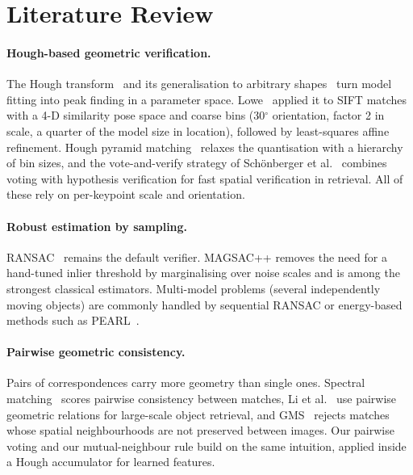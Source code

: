 \documentclass{article}
\begin{document}
\section{Literature Review}

\paragraph{Hough-based geometric verification.}
The Hough transform~\cite{duda1972hough} and its generalisation to arbitrary
shapes~\cite{ballard1981ght} turn model fitting into peak finding in a
parameter space. Lowe~\cite{lowe2004sift} applied it to SIFT matches with a
4-D similarity pose space and coarse bins (30$^\circ$ orientation, factor 2 in
scale, a quarter of the model size in location), followed by least-squares
affine refinement. Hough pyramid matching~\cite{tolias2011hpm} relaxes the
quantisation with a hierarchy of bin sizes, and the vote-and-verify strategy
of Sch\"onberger et al.~\cite{schonberger2016vote} combines voting with
hypothesis verification for fast spatial verification in retrieval. All of
these rely on per-keypoint scale and orientation.

\paragraph{Robust estimation by sampling.}
RANSAC~\cite{fischler1981ransac} remains the default verifier. MAGSAC++
\cite{barath2020magsacpp} removes the need for a hand-tuned inlier threshold
by marginalising over noise scales and is among the strongest classical
estimators. Multi-model problems (several independently moving objects) are
commonly handled by sequential RANSAC or energy-based methods such as
PEARL~\cite{isack2012pearl}.

\paragraph{Pairwise geometric consistency.}
Pairs of correspondences carry more geometry than single ones. Spectral
matching~\cite{leordeanu2005spectral} scores pairwise consistency between
matches, Li et al.~\cite{li2015pairwise} use pairwise geometric relations for
large-scale object retrieval, and GMS~\cite{bian2017gms} rejects matches whose
spatial neighbourhoods are not preserved between images. Our pairwise voting
and our mutual-neighbour rule build on the same intuition, applied inside a
Hough accumulator for learned features.
\end{document}
